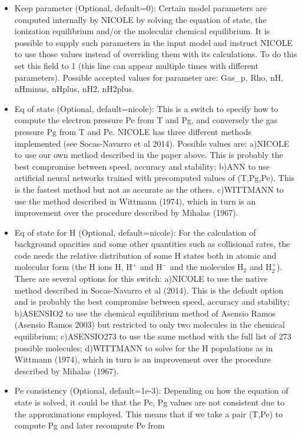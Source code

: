 \begin{itemize}
\item Keep {parameter} (Optional, default=0): Certain model parameters
  are computed internally by NICOLE by solving the equation of state,
  the ionization equilibrium and/or the molecular chemical
  equilibrium. It is possible to supply such parameters in the input
  model and instruct NICOLE to use those values instead of overriding
  them with its calculations. To do this set this field to 1 (this
  line can appear multiple times with different parameters). Possible
  accepted values for parameter are: Gas\_p, Rho, nH, nHminus, nHplus,
  nH2, nH2plus.
\item Eq of state (Optional, default=nicole): This is a switch to
  specify how to compute the electron pressure Pe from T and Pg, and
  conversely the gas pressure Pg from T and Pe. NICOLE has three
  different methods implemented (see Socas-Navarro et al
  2014). Possible values are: a)NICOLE to use our own method described
  in the paper above. This is probably the best compromise between
  speed, accuracy and stability; b)ANN to use artificial neural
  networks trained with precomputed values of (T,Pg,Pe). This is the
  fastest method but not as accurate as the others. c)WITTMANN to use
  the method described in Wittmann (1974), which in turn is an
  improvement over the procedure described by Mihalas (1967).
\item Eq of state for H (Optional, default=nicole): For the
  calculation of background opacities and some other quantities such
  as collisional rates, the code needs the relative distribution of
  some H states both in atomic and molecular form (the H ions H, H$^+$
  and H$^-$ and the molecules H$_2$ and H$_2^+$). There are several
  options for this switch: a)NICOLE to use the native method described
  in Socas-Navarro et al (2014). This is the default option and is
  probably the best compromise between speed, accuracy and stability;
  b)ASENSIO2 to use the chemical equilibrium method of Asensio Ramos
  (Asensio Ramos 2003) but restricted to only two molecules in the
  chemical equilibrium; c)ASENSIO273 to use the same method with the
  full list of 273 possible molecules; d)WITTMANN to solve for the H
  populations as in Wittmann (1974), which in turn is an improvement
  over the procedure described by Mihalas (1967).
\item Pe consistency (Optional, default=1e-3): Depending on how the
  equation of state is solved, it could be that the Pe, Pg values are
  not consistent due to the approximations employed. This means that
  if we take a pair (T,Pe) to compute Pg and later recompute Pe from

\end{itemize}
